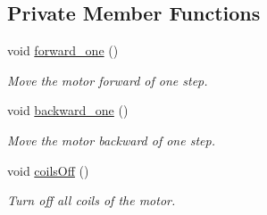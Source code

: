 \subsection*{Private Member Functions}
\begin{DoxyCompactItemize}
\item 
void \hyperlink{class_m_s_m_c___u_l_n2003_a_a76c32768742d1f13f91a498224be1688}{forward\+\_\+one} ()
\begin{DoxyCompactList}\small\item\em Move the motor forward of one step. \end{DoxyCompactList}\item 
void \hyperlink{class_m_s_m_c___u_l_n2003_a_af77993ed4197f6cbcfda0b7127dccfcc}{backward\+\_\+one} ()
\begin{DoxyCompactList}\small\item\em Move the motor backward of one step. \end{DoxyCompactList}\item 
void \hyperlink{class_m_s_m_c___u_l_n2003_a_af351ae2229c5cd9f12d633a44394d2e5}{coils\+Off} ()
\begin{DoxyCompactList}\small\item\em Turn off all coils of the motor. \end{DoxyCompactList}\end{DoxyCompactItemize}
